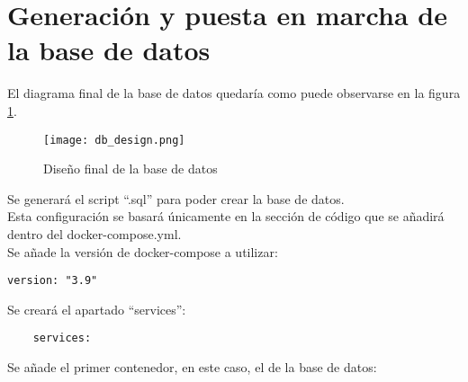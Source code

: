 \section{Generación y puesta en marcha de la base de datos}

El diagrama final de la base de datos quedaría como puede observarse en la figura \ref{fig:db-design}.
\begin{figure}[h]
  \texttt{[image: db\_design.png]}
  \caption{Diseño final de la base de datos}\label{fig:db-design}
\end{figure}
Se generará el script ``.sql'' para poder crear la base de datos.
\\Esta configuración se basará únicamente en la sección de código que se añadirá dentro del docker-compose.yml.
\\Se añade la versión de docker-compose a utilizar:

\begin{verbatim}
version: "3.9"
\end{verbatim}

Se creará el apartado ``services'':

\begin{verbatim}
    services:
\end{verbatim}

Se añade el primer contenedor, en este caso, el de la base de datos:

